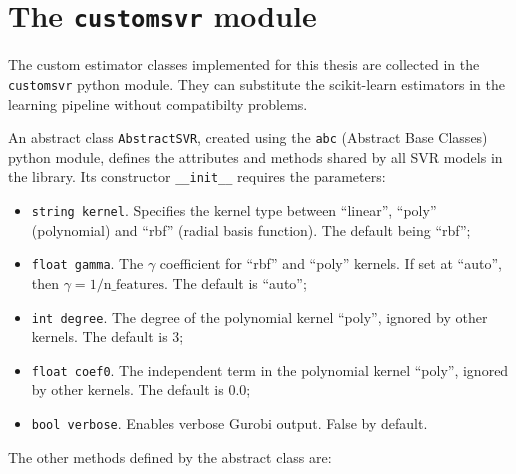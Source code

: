 \documentclass[12pt]{report}
\begin{document}
\section{The \texttt{customsvr} module}
The custom estimator classes implemented for this thesis are collected in the \texttt{customsvr} python module. They can substitute the scikit-learn estimators in the learning pipeline without compatibilty problems.

An abstract class \texttt{AbstractSVR}, created using the \texttt{abc} (Abstract Base Classes) python module, defines the attributes and methods shared by all SVR models in the library. Its constructor \texttt{\_\_init\_\_} requires the parameters:
\begin{itemize}
\item \texttt{string kernel}. Specifies the kernel type between ``linear'', ``poly'' (polynomial) and ``rbf'' (radial basis function). The default being ``rbf'';
\item \texttt{float gamma}. The $\gamma$ coefficient for ``rbf'' and ``poly'' kernels. If set at ``auto'', then $\gamma=1/\text{n\_features}$. The default is ``auto'';
\item \texttt{int degree}. The degree of the polynomial kernel ``poly'', ignored by other kernels. The default is 3;
\item \texttt{float coef0}. The independent term in the polynomial kernel ``poly'', ignored by other kernels. The default is 0.0;
\item \texttt{bool verbose}. Enables verbose Gurobi output. False by default.
\end{itemize}
The other methods defined by the abstract class are:
\end{document}

